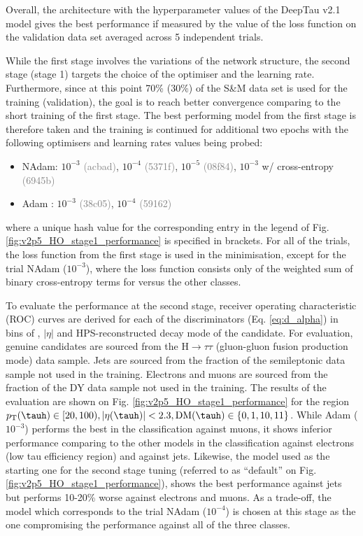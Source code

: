 Overall, the architecture with the hyperparameter values of the DeepTau v2.1 model gives the best performance if measured by the value of the loss function on the validation data set averaged across 5 independent trials.

While the first stage involves the variations of the network structure, the second stage (stage 1) targets the choice of the optimiser and the learning rate. Furthermore, since at this point 70\% (30\%) of the S\&M data set is used for the training (validation), the goal is to reach better convergence comparing to the short training of the first stage. The best performing model from the first stage is therefore taken and the training is continued for additional two epochs with the following optimisers and learning rates values being probed:
\begin{itemize}
    \item NAdam: $10^{-3}$ \textcolor{gray}{(acbad)}, $10^{-4}$ \textcolor{gray}{(5371f)}, $10^{-5}$ \textcolor{gray}{(08f84)}, $10^{-3}$ w/ cross-entropy \textcolor{gray}{(6945b)}
    \item Adam \cite{kingma2014adam}: $10^{-3}$ \textcolor{gray}{(38c05)}, $10^{-4}$ \textcolor{gray}{(59162)}
\end{itemize}

where a unique hash value for the corresponding entry in the legend of Fig. \ref{fig:v2p5_HO_stage1_performance} is specified in brackets. For all of the trials, the loss function from the first stage is used in the minimisation, except for the trial NAdam ($10^{-3}$), where the loss function consists only of the weighted sum of binary cross-entropy terms for \tauh versus the other classes.

To evaluate the performance at the second stage, receiver operating characteristic (ROC) curves are derived for each of the discriminators (Eq. \ref{eq:d_alpha}) in bins of \pt, $|\eta|$ and HPS-reconstructed decay mode of the \tauh candidate. For evaluation, genuine \tauh candidates are sourced from the $\text{H} \to \tau\tau$ (gluon-gluon fusion production mode) data sample. Jets are sourced from the fraction of the semileptonic \ttbar data sample not used in the training. Electrons and muons are sourced from the fraction of the DY data sample not used in the training. The results of the evaluation are shown on Fig. \ref{fig:v2p5_HO_stage1_performance} for the region $p_\text{T}(\tauh) \in [20,100), |\eta(\tauh)| < 2.3, \text{DM}(\tauh) \in \{0,1,10,11\}$. While Adam ($10^{-3}$) performs the best in the classification against muons, it shows inferior performance comparing to the other models in the classification against electrons (low tau efficiency region) and against jets. Likewise, the model used as the starting one for the second stage tuning (referred to as \enquote{default} on Fig. \ref{fig:v2p5_HO_stage1_performance}), shows the best performance against jets but performs 10-20\% worse against electrons and muons. As a trade-off, the model which corresponds to the trial NAdam ($10^{-4}$) is chosen at this stage as the one compromising the performance against all of the three classes.


